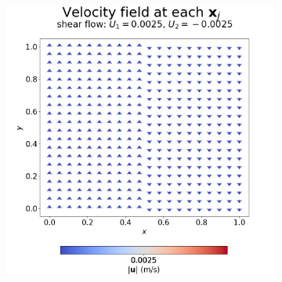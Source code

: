                 \begin{figure}
                    \begin{subfigure}{0.4\textwidth}
                        \centering
                        \includegraphics[width=\textwidth]{diagrams/results-mri/simple-tests/mri-spins_quiver_2D_shear_test_2.png}
                        \caption{}
                        \label{fig:mri-shear-2:quiver}
                    \end{subfigure}
                    \vspace{4mm} %
                    \begin{subfigure}{0.4\textwidth}
                        \centering

\end{subfigure}
\end{figure}
